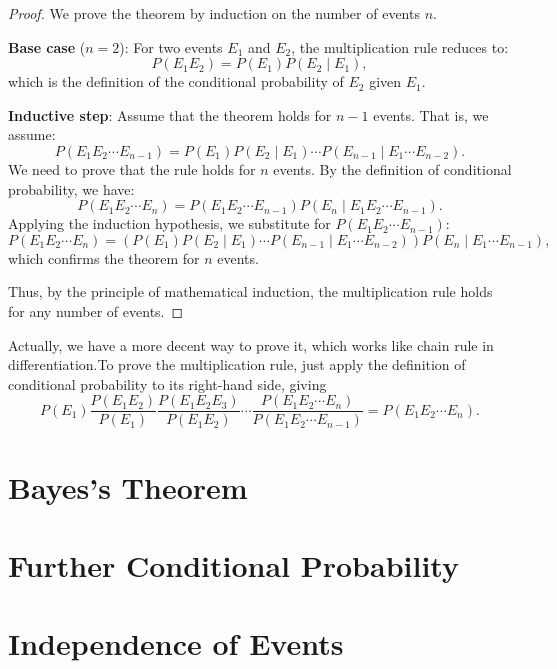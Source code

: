             \begin{proof}
            We prove the theorem by induction on the number of events \(n\).
            
            \textbf{Base case} (\(n = 2\)): For two events \(E_1\) and \(E_2\), the multiplication rule reduces to:
            \[
            P(E_1 E_2) = P(E_1) P(E_2 \mid E_1),
            \]
            which is the definition of the conditional probability of \(E_2\) given \(E_1\).
            
            \textbf{Inductive step}: Assume that the theorem holds for \(n-1\) events. That is, we assume:
            \[
            P(E_1 E_2 \cdots E_{n-1}) = P(E_1) P(E_2 \mid E_1) \cdots P(E_{n-1} \mid E_1 \cdots E_{n-2}).
            \]
            We need to prove that the rule holds for \(n\) events. By the definition of conditional probability, we have:
            \[
            P(E_1 E_2 \cdots E_n) = P(E_1 E_2 \cdots E_{n-1}) P(E_n \mid E_1 E_2 \cdots E_{n-1}).
            \]
            Applying the induction hypothesis, we substitute for \(P(E_1 E_2 \cdots E_{n-1})\):
            \[
            P(E_1 E_2 \cdots E_n) = \left(P(E_1) P(E_2 \mid E_1) \cdots P(E_{n-1} \mid E_1 \cdots E_{n-2})\right) P(E_n \mid E_1 \cdots E_{n-1}),
            \]
            which confirms the theorem for \(n\) events.
            
            Thus, by the principle of mathematical induction, the multiplication rule holds for any number of events.
        \end{proof}
        \begin{remark}
            Actually, we have a more decent way to prove it, which works like chain rule in differentiation.To prove the multiplication rule, just apply the definition of conditional probability
            to its right-hand side, giving
            \[P(E_1)\frac{P(E_1E_2)}{P(E_1)}\frac{P(E_1E_2E_3)}{P(E_1E_2)}\cdots\frac{P(E_1E_2\cdots E_n)}{P(E_1E_2\cdots E_{n-1})}=P(E_1E_2\cdots E_n).\]
        \end{remark}

        
\section{Bayes's Theorem}

\section{Further Conditional Probability}

\section{Independence of Events}